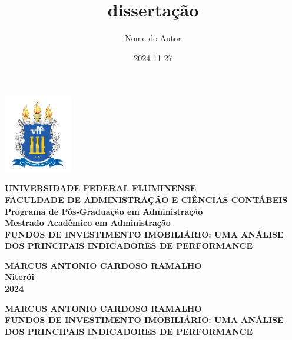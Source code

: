 \documentclass[
  12pt,
]{article}
\title{dissertação}
\author{Nome do Autor}
\date{2024-11-27}
\begin{document}



\begin{center}
    \includegraphics[angle=0,keepaspectratio,width=3cm]{UFF.png}
    \end{center}
    
    \begin{center}
    \textbf{\fontsize{12}{14}\selectfont 
    UNIVERSIDADE FEDERAL FLUMINENSE\\[0.2cm]
    FACULDADE DE ADMINISTRAÇÃO E CIÊNCIAS CONTÁBEIS\\[0.2cm]
    Programa de Pós-Graduação em Administração\\[0.2cm]
    Mestrado Acadêmico em Administração\\[4.5cm]
    FUNDOS DE INVESTIMENTO IMOBILIÁRIO: UMA ANÁLISE DOS PRINCIPAIS INDICADORES DE PERFORMANCE\\[4cm]
    }
    \end{center}
    
    \begin{center}
    \textbf{MARCUS ANTONIO CARDOSO RAMALHO\\[5.5cm]
    Niterói\\[0.2cm]
    2024
    }
    \end{center}
    \thispagestyle{empty}
    \begin{center}
    
    \textbf{MARCUS ANTONIO CARDOSO RAMALHO\\[1.5cm]
            FUNDOS DE INVESTIMENTO IMOBILIÁRIO: UMA ANÁLISE DOS PRINCIPAIS INDICADORES DE PERFORMANCE\\[5cm]
            }
        
       
        
        \end{center}
    
    
    \begin{quotation}
    \setlength{\leftskip}{7cm}
    \end{quotation}
    
\end{document}
